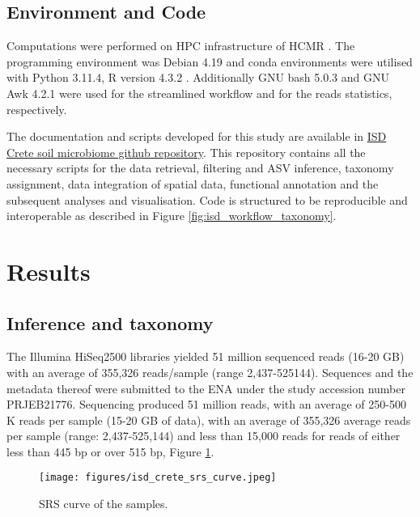 \subsection{Environment and Code}

Computations were performed on HPC infrastructure of HCMR \parencite{zafeiropoulos_0s_2021}.
The programming environment was Debian 4.19 and conda environments were utilised
with Python 3.11.4, R version 4.3.2 \parencite{rcoreteam}.
Additionally GNU bash 5.0.3 and GNU Awk 4.2.1 were used for the streamlined workflow 
and for the reads statistics, respectively.

The documentation and scripts developed for this study are available in
\href{https://github.com/GenomicsStandardsConsortium/ISD}{ISD Crete soil microbiome github repository}.
This repository contains all the necessary scripts for the data retrieval,
filtering and ASV inference, taxonomy assignment, data integration of spatial data, 
functional annotation and the subsequent analyses and visualisation.
Code is structured to be reproducible and interoperable as described in Figure \ref{fig:isd_workflow_taxonomy}.


\section{Results}\label{isd_results}

\subsection{Inference and taxonomy}\label{inference_taxonomy}

The Illumina HiSeq2500 libraries yielded 51 million sequenced reads (16-20 GB) with
an average of 355,326 reads/sample (range 2,437-525144). Sequences and the
metadata thereof were submitted to the ENA under the study accession number PRJEB21776.
Sequencing produced 51 million reads, with an average of 250-500 K reads per
sample (15-20 GB of data), with an average of 355,326 average reads per sample
(range: 2,437-525,144) and less than 15,000 reads for reads of either less than
445 bp or over 515 bp, Figure \ref{fig:isd_srs-curve_samples}.
   
   \begin{figure}[h]
      \centering
      \texttt{[image: figures/isd\_crete\_srs\_curve.jpeg]}
      \caption[SRS curve]{SRS curve of the samples. }
      \label{fig:isd_srs-curve_samples}
   \end{figure}

